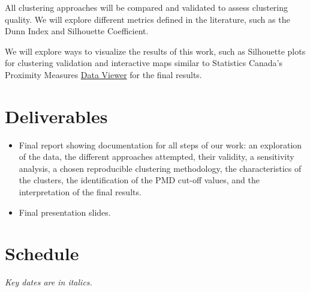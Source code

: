 \documentclass[11pt, a4paper]{article}
\begin{document}
All clustering approaches will be compared and validated to assess clustering quality. We will explore different metrics defined in the literature, such as the Dunn Index and Silhouette Coefficient.
\par
We will explore ways to visualize the results of this work, such as Silhouette plots for clustering validation and interactive maps similar to Statistics Canada’s Proximity Measures \href{https://www150.statcan.gc.ca/n1/pub/71-607-x/71-607-x2020011-eng.htm}{Data Viewer} for the final results.




\section*{Deliverables}

\begin{itemize}
\item Final report showing documentation for all steps of our work: an exploration of the data, the different approaches attempted, their validity, a sensitivity analysis, a chosen reproducible clustering methodology, the characteristics of the clusters, the identification of the PMD cut-off values, and the interpretation of the final results. 
\item Final presentation slides.
\end{itemize}




\pagebreak
\section*{Schedule}

\textit{Key dates are in italics.}
\end{document}
